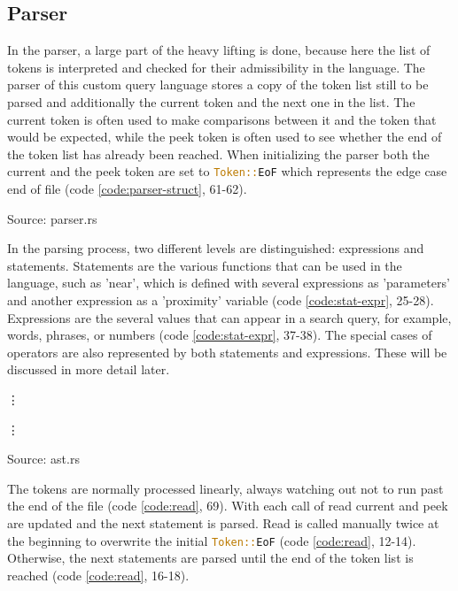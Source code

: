 \subsection{Parser}
In the parser, a large part of the heavy lifting is done, because here the list of tokens is interpreted and checked for their admissibility in the language. The parser of this custom query language stores a copy of the token list still to be parsed and additionally the current token and the next one in the list. The current token is often used to make comparisons between it and the token that would be expected, while the peek token is often used to see whether the end of the token list has already been reached. When initializing the parser both the current and the peek token are set to \lstinline[language=Rust]$Token::EoF$ which represents the edge case end of file (code \ref{code:parser-struct}, 61-62).
\begin{codeenv}
    \label{code:parser-struct}
    
    \centerline{Source: parser.rs}
\end{codeenv}
In the parsing process, two different levels are distinguished: expressions and statements. Statements are the various functions that can be used in the language, such as 'near', which is defined with several expressions as 'parameters' and another expression as a 'proximity' variable (code \ref{code:stat-expr}, 25-28). Expressions are the several values that can appear in a search query, for example, words, phrases, or numbers (code \ref{code:stat-expr}, 37-38). The special cases of operators are also represented by both statements and expressions. These will be discussed in more detail later.
\begin{codeenv}
    \label{code:stat-expr}
    
    \vdots
    
    \vdots
    
    \centerline{Source: ast.rs}
\end{codeenv}
The tokens are normally processed linearly, always watching out not to run past the end of the file (code \ref{code:read}, 69). With each call of read current and peek are updated and the next statement is parsed. Read is called manually twice at the beginning to overwrite the initial \lstinline[language=Rust]$Token::EoF$ (code \ref{code:read}, 12-14). Otherwise, the next statements are parsed until the end of the token list is reached (code \ref{code:read}, 16-18).
